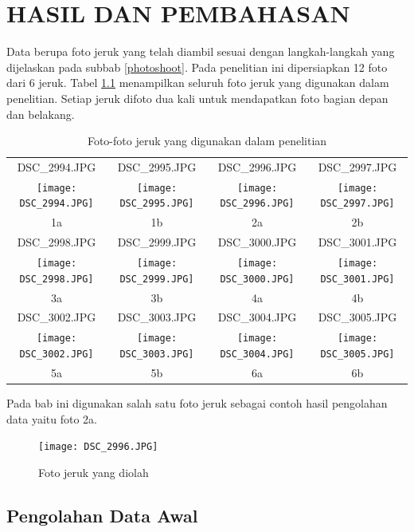 \documentclass[laporan.tex]{subfiles}
\begin{document}
\chapter{HASIL DAN PEMBAHASAN}

Data berupa foto jeruk yang telah diambil sesuai dengan langkah-langkah yang dijelaskan pada subbab \ref{photoshoot}. Pada penelitian ini dipersiapkan 12 foto dari 6 jeruk. Tabel \ref{table:orangeallstars} menampilkan seluruh foto jeruk yang digunakan dalam penelitian. Setiap jeruk difoto dua kali untuk mendapatkan foto bagian depan dan belakang.

\begin{table}[h!]
\centering
\begin{tabular}{|c|c|c|c|}
\hline
DSC\_2994.JPG & DSC\_2995.JPG & DSC\_2996.JPG & DSC\_2997.JPG \\ 
\texttt{[image: DSC\_2994.JPG]} &
\texttt{[image: DSC\_2995.JPG]} &
\texttt{[image: DSC\_2996.JPG]} &
\texttt{[image: DSC\_2997.JPG]} \\
1a & 1b & 2a & 2b \\
\hline
DSC\_2998.JPG & DSC\_2999.JPG & DSC\_3000.JPG & DSC\_3001.JPG \\ 
\texttt{[image: DSC\_2998.JPG]} &
\texttt{[image: DSC\_2999.JPG]} &
\texttt{[image: DSC\_3000.JPG]} &
\texttt{[image: DSC\_3001.JPG]} \\
3a & 3b & 4a & 4b \\
\hline
DSC\_3002.JPG & DSC\_3003.JPG & DSC\_3004.JPG & DSC\_3005.JPG \\ 
\texttt{[image: DSC\_3002.JPG]} &
\texttt{[image: DSC\_3003.JPG]} &
\texttt{[image: DSC\_3004.JPG]} &
\texttt{[image: DSC\_3005.JPG]} \\
5a & 5b & 6a & 6b \\
\hline
\end{tabular}
\caption{Foto-foto jeruk yang digunakan dalam penelitian}
\label{table:orangeallstars}
\end{table}

Pada bab ini digunakan salah satu foto jeruk sebagai contoh hasil pengolahan data yaitu foto 2a.

\begin{figure}[h]
\centering
\texttt{[image: DSC\_2996.JPG]}
\caption{Foto jeruk yang diolah}
\end{figure}

\section{Pengolahan Data Awal}
\end{document}
